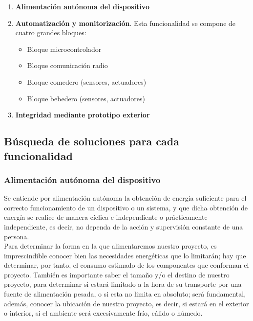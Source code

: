 \documentclass[12pt]{article}
\begin{document}
	\begin{enumerate}
		\item \textbf{Alimentación autónoma del dispositivo}
		\item \textbf{Automatización y monitorización}. Esta funcionalidad se compone de cuatro grandes bloques:
		\begin{itemize}
			\item Bloque microcontrolador
			\item Bloque comunicación radio 
			\item Bloque comedero (sensores, actuadores)
			\item Bloque bebedero (sensores, actuadores)
		\end{itemize}
	
		\item \textbf{Integridad mediante prototipo exterior}
	\end{enumerate}
	
	\subsection[Búsqueda soluciones]{Búsqueda de soluciones para cada funcionalidad}

	\subsubsection{Alimentación autónoma del dispositivo}
	\label{subseccion 3.2.1: búsqueda soluciones alimentación}
	\noindent Se entiende por alimentación autónoma la obtención de energía suficiente para el correcto funcionamiento de un dispositivo o un sistema, y que dicha obtención de energía se realice de manera cíclica e independiente o prácticamente independiente, es decir, no dependa de la acción y supervisión constante de una persona. \\
	
	\noindent Para determinar la forma en la que alimentaremos nuestro proyecto, es imprescindible conocer bien las necesidades energéticas que lo limitarán; hay que determinar, por tanto, el consumo estimado de los componentes que conforman el proyecto. También es importante saber el tamaño y/o el destino de nuestro proyecto, para determinar si estará limitado a la hora de su transporte por una fuente de alimentación pesada, o si esta no limita en absoluto; será fundamental, además, conocer la ubicación de nuestro proyecto, es decir, si estará en el exterior o interior, si el ambiente será excesivamente frío, cálido o húmedo.\\
	
\end{document}
